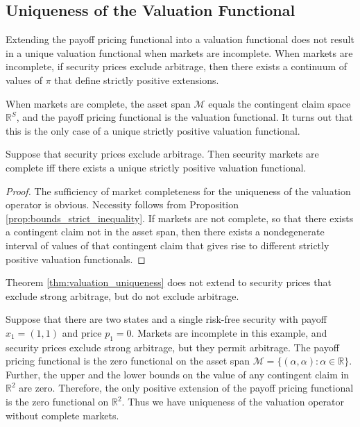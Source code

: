 \documentclass[\topdir/lecture\_notes.tex]{subfiles}
\begin{document}
\subsection{Uniqueness of the Valuation Functional}
Extending the payoff pricing functional into a valuation functional does not result in a unique valuation functional when markets are incomplete. When markets are incomplete, if security prices exclude arbitrage, then there exists a continuum of values of \(\pi\) that define strictly positive extensions.

When markets are complete, the asset span \(\mathcal{M}\) equals the contingent claim space \(\mathbb{R}^{S}\), and the payoff pricing functional is the valuation functional. It turns out that this is the only case of a unique strictly positive valuation functional.

\begin{theorem}\label{thm:valuation_uniqueness}
Suppose that security prices exclude arbitrage. Then security markets are complete iff there exists a unique strictly positive valuation functional.
\end{theorem}
\begin{proof}
The sufficiency of market completeness for the uniqueness of the valuation operator is obvious. Necessity follows from Proposition \ref{prop:bounds_strict_inequality}. If markets are not complete, so that there exists a contingent claim not in the asset span, then there exists a nondegenerate interval of values of that contingent claim that gives rise to different strictly positive valuation functionals.
\end{proof}
Theorem \ref{thm:valuation_uniqueness} does not extend to security prices that exclude strong arbitrage, but do not exclude arbitrage.
\begin{example}\label{ex:zero_price_security}
Suppose that there are two states and a single risk-free security with payoff \(x_{1}=(1,1)\) and price \(p_{1}=0\). Markets are incomplete in this example, and security prices exclude strong arbitrage, but they permit arbitrage. The payoff pricing functional is the zero functional on the asset span \(\mathcal{M}=\{(\alpha, \alpha) \colon \alpha \in \mathbb{R}\}\). Further, the upper and the lower bounds on the value of any contingent claim in \(\mathbb{R}^{2}\) are zero. Therefore, the only positive extension of the payoff pricing functional is the zero functional on \(\mathbb{R}^{2}\). Thus we have uniqueness of the valuation operator without complete markets.
\end{example}
\end{document}
